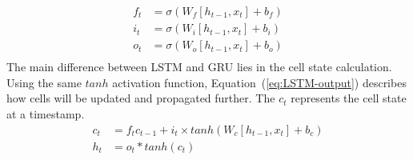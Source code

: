 \begin{equation}
    \begin{split}
        f_t &= \sigma \left(W_f \left[h_{t-1}, x_t \right] + b_f \right) \\
        i_t &= \sigma \left(W_i \left[h_{t-1}, x_t \right] + b_i \right) \\
        o_t &= \sigma \left(W_o \left[h_{t-1}, x_t \right] + b_o \right) \\    
    \end{split}
    \label{eq:LSTM-gates}
\end{equation}
The main difference between LSTM and GRU lies in the cell state calculation.
Using the same $tanh$ activation function, \mbox{Equation~(\ref{eq:LSTM-output})} describes how cells will be updated and propagated further.
The $c_t$ represents the cell state at a timestamp.
\begin{equation}
    \begin{split}
        c_t &= f_t c_{t-1}+i_t \times tanh \left(W_c \left[h_{t-1}, x_t \right] + b_c \right) \\
        h_t &= o_t*tanh \left(c_t \right)
    \end{split}
    \label{eq:LSTM-output}
\end{equation}


%
